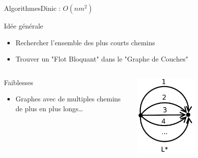 \begin{frame}{Algorithmes}{Dinic : $O(nm^2)$}
\begin{block}{Idée générale}
\begin{itemize}
\item Rechercher l'ensemble des plus courts chemins
\item Trouver un "Flot Bloquant" dans le "Graphe de Couches"
\end{itemize}
\end{block}

\begin{columns}
  \begin{column}[l]{0.6\textwidth}

  \begin{column}[l]{0.6\textwidth}
\begin{block}{Faiblesses}
    \begin{itemize}
      \item Graphes avec de multiples chemins de plus en plus longs\dots
    \end{itemize}
    \end{block}
  \end{column}
  \end{column}
 \begin{column}[r]{0.4\textwidth}
    \includegraphics[width=0.5\textwidth]{img/anti_dinic}
  \end{column}
\end{columns}
\end{frame}